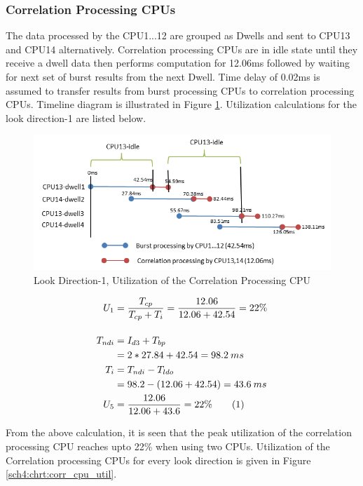\subsubsection{Correlation Processing CPUs} 
The data processed by the CPU1...12 are grouped as Dwells and sent to CPU13 and CPU14 alternatively. Correlation processing CPUs are in idle state until they receive a dwell data then performs computation for 12.06ms followed by waiting for next set of burst results from the next Dwell. Time delay of 0.02ms is assumed to transfer results from burst processing CPUs to correlation processing CPUs. Timeline diagram is illustrated in Figure \ref{fig:mm:scheme5_corr_timeline}. Utilization calculations for the look direction-1 are listed below. 

\begin{figure}[h!]
	\centering
	\includegraphics[]{figures/scheme5_corr_timeline}
	\caption{Look Direction-1, Utilization of the Correlation Processing CPU}
	\label{fig:mm:scheme5_corr_timeline}
\end{figure}

\begin{align*}
	U_{1} &= \frac{T_{cp}}{ T_{cp} + T_{i}} =  \frac{12.06}{12.06 + 42.54} = 22\% \\[0.4cm]
	T_{ndi} &= I_{d3} + T_{bp} \\
	&= 2 * 27.84 + 42.54 = 98.2 \: ms\\
	T_{i} &= T_{ndi} - T_{ldo} \\
	&= 98.2 - (12.06 + 42.54) = 43.6 \: ms \\
	U_{5} &= \frac{12.06}{12.06 + 43.6} = 22\%   \stepcounter{equation}\tag{\theequation}
\end{align*}

From the above calculation, it is seen that the peak utilization of the correlation processing CPU reaches upto 22\% when using two CPUs. Utilization of the Correlation processing CPUs for every look direction is given in Figure \ref{sch4:chrt:corr_cpu_util}.

